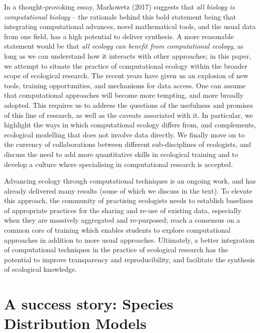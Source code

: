 \documentclass[12pt]{article}
\begin{document}
In a thought-provoking essay, Markowetz (2017) suggests that \emph{all
biology is computational biology} -- the rationale behind this bold
statement being that integrating computational advances, novel
mathematical tools, and the usual data from one field, has a high
potential to deliver synthesis. A more reasonable statement would be
that \emph{all ecology can benefit from computational ecology}, as long
as we can understand how it interacts with other approaches; in this
paper, we attempt to situate the practice of computational ecology
within the broader scope of ecological research. The recent years have
given us an explosion of new tools, training opportunities, and
mechanisms for data access. One can assume that computational approaches
will become more tempting, and more broadly adopted. This requires us to
address the questions of the usefulness and promises of this line of
research, as well as the caveats associated with it. In particular, we
highlight the ways in which computational ecology differs from, and
complements, ecological modelling that does not involve data directly.
We finally move on to the currency of collaborations between different
sub-disciplines of ecologists, and discuss the need to add more
quantitative skills in ecological training and to develop a culture
where specialising in computational research is accepted.

Advancing ecology through computational techniques is an ongoing work,
and has already delivered many results (some of which we discuss in the
text). To elevate this approach, the community of practising ecologists
needs to establish baselines of appropriate practices for the sharing
and re-use of existing data, especially when they are massively
aggregated and re-purposed; reach a consensus on a common core of
training which enables students to explore computational approaches in
addition to more usual approaches. Ultimately, a better integration of
computational techniques in the practice of ecological research has the
potential to improve transparency and reproducibility, and facilitate
the synthesis of ecological knowledge.

\hypertarget{a-success-story-species-distribution-models}{%
\section{A success story: Species Distribution
Models}\label{a-success-story-species-distribution-models}}
\end{document}
